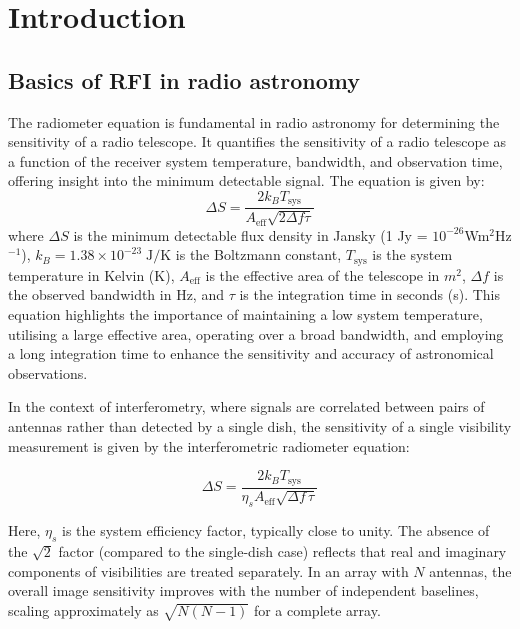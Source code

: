 \section{Introduction}
\label{section:hardware: introduction}


\subsection{Basics of RFI in radio astronomy}
The radiometer equation is fundamental in radio astronomy for determining the sensitivity of a radio telescope. It quantifies the sensitivity of a radio telescope as a function of the receiver system temperature, bandwidth, and observation time, offering insight into the minimum detectable signal. The equation is given by:
\[ \Delta S = \frac{2 k_B T_{\text{sys}}}{A_{\text{eff}} \sqrt{2 \Delta f \tau}} \]
where \( \Delta S \) is the minimum detectable flux density in Jansky (1 Jy = $10^{-26}$Wm$^2$Hz$^{-1}$), \( k_B =1.38 \times 10^{-23} \;\text{J} / \text{K}\) is the Boltzmann constant, \( T_{\text{sys}} \) is the system temperature in Kelvin (K), \( A_{\text{eff}} \) is the effective area of the telescope in $m^2$, \( \Delta f \) is the observed bandwidth in Hz, and \( \tau \) is the integration time in seconds (s). This equation highlights the importance of maintaining a low system temperature, utilising a large effective area, operating over a broad bandwidth, and employing a long integration time to enhance the sensitivity and accuracy of astronomical observations.

In the context of interferometry, where signals are correlated between pairs of antennas rather than detected by a single dish, the sensitivity of a single visibility measurement is given by the interferometric radiometer equation:

\[ \Delta S = \frac{2 k_B T_{\text{sys}}}{\eta_s A_{\text{eff}} \sqrt{ \Delta f \, \tau }} \]

Here, $\eta_s$ is the system efficiency factor, typically close to unity. The absence of the $\sqrt{2}$ factor (compared to the single-dish case) reflects that real and imaginary components of visibilities are treated separately. In an array with $N$ antennas, the overall image sensitivity improves with the number of independent baselines, scaling approximately as $\sqrt{N(N-1)}$ for a complete array.

